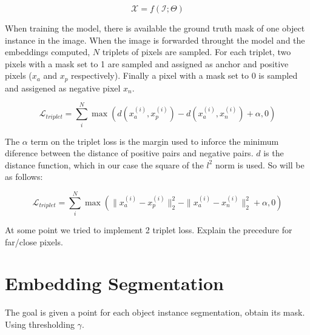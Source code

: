 \begin{equation}
  \mathcal{X} = f(\mathcal{I}; \Theta)
\end{equation}

When training the model, there is available the ground truth mask of one object instance in the image. When the image is forwarded throught the model and the embeddings computed, $N$ triplets of pixels are sampled. For each triplet, two pixels with a mask set to 1 are sampled and assigned as anchor and positive pixels ($x_a$ and $x_p$ respectively). Finally a pixel with a mask set to 0 is sampled and assigened as negative pixel $x_n$.

\begin{equation}
  \label{eq:triplet_loss_1}
  \mathcal{L}_{triplet} = \sum_i^N \max \left( d(x_a^{(i)}, x_p^{(i)}) - d(x_a^{(i)}, x_n^{(i)})  + \alpha, 0 \right)
\end{equation}

The $\alpha$ term on the triplet loss is the margin used to inforce the minimum diference between the distance of positive pairs and negative pairs. $d$ is the distance function, which in our case the square of the $l^2$ norm is used. So  will be as follows:

\begin{equation}
  \label{eq:triplet_loss_2}
  \mathcal{L}_{triplet} =
	\sum_i^N \max \left(
		\|x_a^{(i)} - x_p^{(i)}\|^2_2 - \|x_a^{(i)} - x_n^{(i)}\|_2^2  + \alpha,
		0 \right)
\end{equation}


At some point we tried to implement 2 triplet loss.
Explain the precedure for far/close pixels.

\section{Embedding Segmentation}

The goal is given a point for each object instance segmentation, obtain its mask.
Using thresholding $\gamma$.






